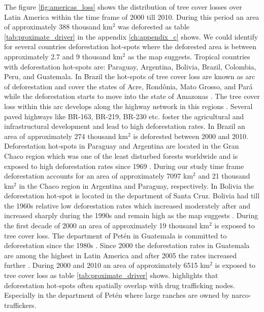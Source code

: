 			The figure \ref{fig:americas_loss} shows the distribution of tree cover losses over Latin America within the time frame of 2000 till 2010. During this period an area of approximately 388 thousand km$^2$ was deforested as table \ref{tab:proximate_driver} in the appendix \ref{ch:appendix_c} shows. We could identify for several countries deforestation hot-spots where the deforested area is between approximately 2.7 and 9 thousand km$^2$ as the map suggests. Tropical countries with deforestation hot-spots are: Paraguay, Argentina, Bolivia, Brazil, Colombia, Peru, and Guatemala. In Brazil the hot-spots of tree cover loss are known as arc of deforestation and cover the states of Acre, Rond\^{o}nia, Mato Grosso, and Par\'{a} while the deforestation starts to move into the state of Amazonas \citep{Wood2002}. The tree cover loss within this arc develops along the highway network in this regions \citep{Alves2002,Mueller2016}. Several paved highways like BR-163, BR-219, BR-230 etc. foster the agricultural and infrastructural development and lead to high deforestation rates. In Brazil an area of approximately 274 thousand km$^2$ is deforested between 2000 and 2010. Deforestation hot-spots in Paraguay and Argentina are located in the Gran Chaco region which was one of the least disturbed forests worldwide and is exposed to high deforestation rates since 1969 \citep{Caldas2013,Zak2004}. During our study time frame deforestation accounts for an area of approximately 7097 km$^2$ and 21 thousand km$^2$ in the Chaco region in Argentina and Paraguay, respectively. In Bolivia the deforestation hot-spot is located in the department of Santa Cruz. Bolivia had till the 1960s relative low deforestation rates which increased moderately after and increased sharply during the 1990s and remain high as the map suggests \citep{Pacheco2002,DavidKaimowitz2002}. During the first decade of 2000 an area of approximately 19 thousand km$^2$ is exposed to tree cover loss. The department of Pet\'{e}n in Guatemala is committed to deforestation since the 1980s \citep{Beach1998}. Since 2000 the deforestation rates in Guatemala are among the highest in Latin America and after 2005 the rates increased further \citep{McSweeney2014}. During 2000 and 2010 an area of approximately 6515 km$^2$ is exposed to tree cover loss as table \ref{tab:proximate_driver} shows. \citeauthor{McSweeney2014} highlights that deforestation hot-spots often spatially overlap with drug trafficking nodes. Especially in the department of Pet\'{e}n where large ranches are owned by narco-traffickers.
